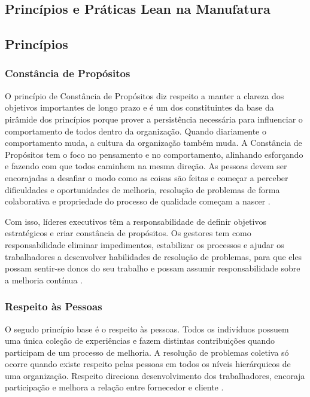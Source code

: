 \begin{anexosenv}

\partanexos

\chapter{Princípios e Práticas Lean na Manufatura}

\section[Princípios]{Princípios}

\subsection[Constância de Propósitos]{Constância de Propósitos}

O princípio de Constância de Propósitos diz respeito a manter a clareza dos objetivos importantes de longo prazo e é um dos constituintes da base da pirâmide dos princípios porque prover a persistência necessária para influenciar o comportamento de todos dentro da organização. Quando diariamente o comportamento muda, a cultura da organização também muda. A Constância de Propósitos tem o foco no pensamento e no comportamento, alinhando esforçando e fazendo com que todos caminhem na mesma direção. As pessoas devem ser encorajadas a desafiar o modo como as coisas são feitas e começar a perceber dificuldades e oportunidades de melhoria, resolução de problemas de forma colaborativa e propriedade do processo de qualidade começam a nascer \cite{bell2011}.

Com isso, líderes executivos têm a responsabilidade de definir objetivos estratégicos e criar constância de propósitos. Os gestores tem como responsabilidade eliminar impedimentos, estabilizar os processos e ajudar os trabalhadores a desenvolver habilidades de resolução de problemas, para que eles possam sentir-se donos do seu trabalho e possam assumir responsabilidade sobre a melhoria contínua  \cite{bell2011}. 


\subsection[Respeito às Pessoas]{Respeito às Pessoas}

O segudo princípio base é o respeito às pessoas. Todos os indivíduos possuem uma única coleção de experiências e fazem distintas contribuições quando participam de um processo de melhoria. A resolução de problemas coletiva só ocorre quando existe respeito pelas pessoas em todos os níveis hierárquicos de uma organização. Respeito direciona desenvolvimento dos trabalhadores, encoraja participação e melhora a relação entre fornecedor e cliente \cite{bell2011}.


\end{anexosenv}
